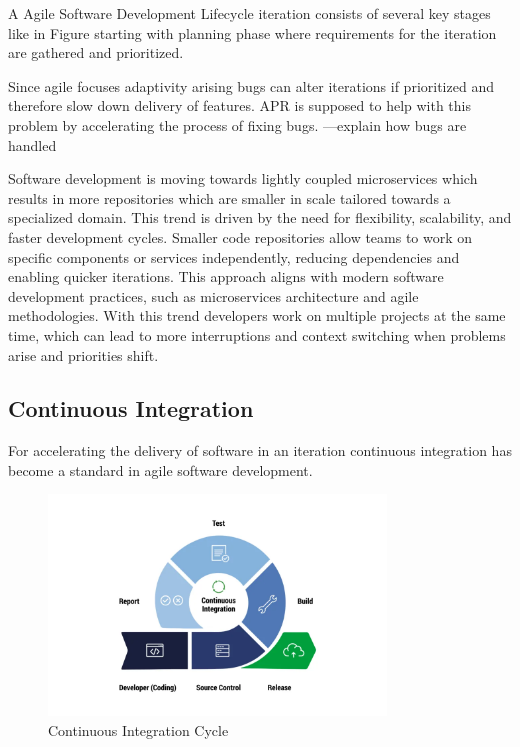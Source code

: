 A Agile Software Development Lifecycle iteration consists of several key stages like in Figure starting with planning phase where requirements for the iteration are gathered and prioritized.

Since agile focuses adaptivity arising bugs can alter iterations if prioritized and therefore slow down delivery of features. APR is supposed to help with this problem by accelerating the process of fixing bugs.
---explain how bugs are handled

Software development is moving towards lightly coupled microservices which results in more repositories which are smaller in scale tailored towards a specialized domain. This trend is driven by the need for flexibility, scalability, and faster development cycles. Smaller code repositories allow teams to work on specific components or services independently, reducing dependencies and enabling quicker iterations. This approach aligns with modern software development practices, such as microservices architecture and agile methodologies.
With this trend developers work on multiple projects at the same time, which can lead to more interruptions and context switching when problems arise and priorities shift.


\subsection{Continuous Integration}

For accelerating the delivery of software in an iteration continuous integration has become a standard in agile software development.

\begin{figure}[htbp]
    \centering
    \includegraphics[width=0.8\textwidth]{images/ci-cycle.png}
    \caption{Continuous Integration Cycle}
    \label{fig:ci-cycle}
\end{figure}

